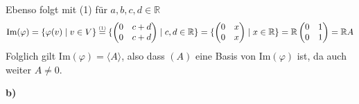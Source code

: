\documentclass[a4paper,graphics,11pt]{article}
\newcommand{\up}[2]{\mathrel{\overset{\makebox[0pt]{\mbox{\normalfont\tiny #2}}}{#1}}}
\begin{document}
Ebenso folgt mit (1) für $a,b,c,d \in \mathbb{R}$
$$
    \text{Im}(\varphi)
    = \{\varphi(v) \mid v \in V\}
    \up{=}{(1)} \{
    \begin{pmatrix}
        0 & c+d\\
        0 & c+d
    \end{pmatrix}
    \mid c,d \in \mathbb{R}\}
    =\{
\begin{pmatrix}
    0 & x\\
        0 & x
    \end{pmatrix}
    \mid x \in \mathbb{R}\}
    = \mathbb{R}
    \begin{pmatrix}
        0 & 1\\
        0 & 1
    \end{pmatrix}
    = \mathbb{R}A
$$
Folglich gilt $\text{Im}(\varphi) = \langle A\rangle$, also dass $(A)$ eine Basis von $\text{Im}(\varphi)$ ist,
da auch weiter $A \neq 0$.

\textbf{b)}
\end{document}

